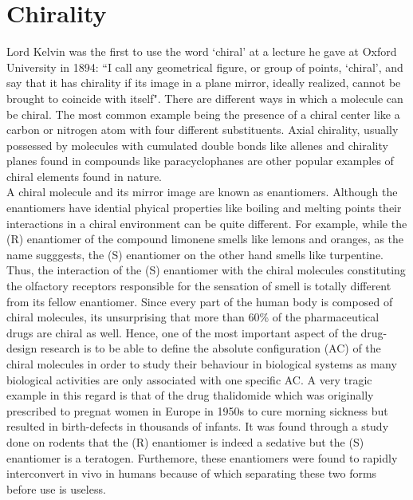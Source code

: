 
\section{Chirality}
Lord Kelvin was the first to use the word `chiral' at a lecture he gave at Oxford 
University in 1894: ``I call any geometrical figure, or group of points, 
`chiral', and say that it has chirality if its image in a plane mirror, ideally realized, 
cannot be brought to coincide with itself"\cite{}. There are different ways in which a molecule 
can be chiral. The most common example being the presence of a chiral center 
like a carbon or nitrogen atom with four different substituents. Axial chirality, usually 
possessed by molecules with cumulated double bonds like allenes and chirality planes 
found in compounds like paracyclophanes are other popular examples of chiral elements 
found in nature. \\
A chiral molecule and its mirror image are known as enantiomers. Although the
enantiomers have idential phyical properties like boiling and melting points their
interactions in a chiral environment can be quite different. For example,
while the (R) enantiomer of the compound limonene smells like lemons and oranges,
as the name sugggests, the (S) enantiomer on the other hand smells like turpentine. 
Thus, the interaction of the (S) enantiomer with the chiral molecules constituting the olfactory receptors 
responsible for the sensation of smell is totally different from its fellow enantiomer.
Since every part of the human body is composed of chiral molecules, its unsurprising that
more than 60\% of the pharmaceutical drugs are chiral as well. Hence, one of the most 
important aspect of the drug-design research is to be able to define the absolute configuration 
(AC) of the chiral molecules in order to study their behaviour in  biological systems as 
many biological activities are only associated with one specific AC. A very tragic example
in this regard is that of the drug thalidomide which was originally prescribed to pregnat women in 
Europe in 1950s to cure morning sickness but resulted in birth-defects in thousands of 
infants. It was found through a study done on rodents that the (R) enantiomer is indeed 
a sedative but the (S) enantiomer is a teratogen\cite{}. Furthemore, these enantiomers were 
found to rapidly interconvert in vivo in humans\cite{} because of which separating 
these two forms before use is useless.\\



